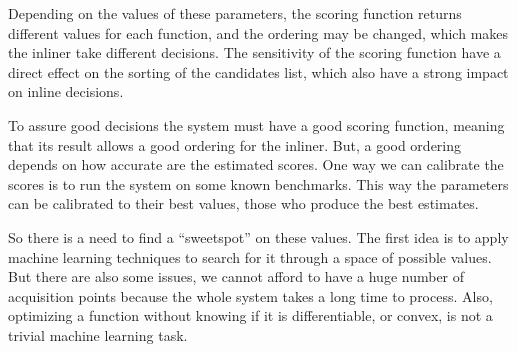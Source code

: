 Depending on the values of these parameters, the scoring function returns
different values for each function, and the ordering may be changed, which
makes the inliner take different decisions. The sensitivity of the scoring
function have a direct effect on the sorting of the candidates list, which
also have a strong impact on inline decisions.

To assure good decisions the system must have a good scoring function,
meaning that its result allows a good ordering for the inliner. But, a good
ordering depends on how accurate are the estimated scores. One way we can
calibrate the scores is to run the system on some known benchmarks. This way
the parameters can be calibrated to their best values, those who produce
the best estimates.

So there is a need to find a ``sweetspot'' on these values. The first idea is
to apply machine learning techniques to search for it through a space of
possible values. But there are also some issues, we cannot afford to have a
huge number of acquisition points because the whole system takes a long time
to process. Also, optimizing a function without knowing if it is differentiable,
or convex, is not a trivial machine learning task.
